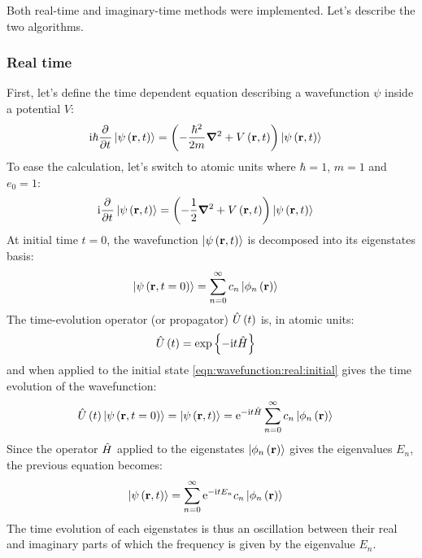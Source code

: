 Both real-time and imaginary-time methods were implemented. Let's describe the
two algorithms.


\subsubsection{Real time}

First, let's define the time dependent \schrodinger equation describing a
wavefunction $\psi$ inside a potential $V$:
\begin{align}
\textrm{i} \hbar \frac{\partial^{{}}   }{\partial t^{{}}} \left| \psi\left( \textbf{r}, t \right) \right>
    & = \left( -\frac{\hbar^2}{2 m} \bm{\nabla}^2 + V\left( \textbf{r}, t \right)  \right) \left| \psi\left( \textbf{r},
t \right) \right>
\label{eqn:schrodinger:si}
\end{align}
To ease the calculation, let's switch to atomic units where $\hbar = 1$, $m
= 1$ and $e_0 = 1$:
\begin{align}
\textrm{i} \frac{\partial^{{}}   }{\partial t^{{}}} \left| \psi\left( \textbf{r}, t \right) \right>
    & = \left( -\frac{1}{2} \bm{\nabla}^2 + V\left( \textbf{r}, t \right)  \right) \left| \psi\left( \textbf{r}, t \right) \right>
\label{eqn:schrodinger:au}
\end{align}
At initial time $t = 0$, the wavefunction $\left| \psi\left( \textbf{r}, t \right) \right>$ is
decomposed into its eigenstates basis:
\begin{align}
\left| \psi\left( \textbf{r}, t=0 \right) \right> & = \sum_{n=0}^{\infty} c_n \left| \phi_n\left( \textbf{r} \right) \right>
\label{eqn:wavefunction:real:initial}
\end{align}
The time-evolution operator (or propagator) $\hat{U}\left( t \right)$ is, in atomic units:
\begin{align}
\hat{U}\left( t \right) & = \exp{ \left\{  - \textrm{i}t  \hat{H} \right\}}
\label{eqn:propagator:real}
\end{align}
and when applied to the initial state \eqref{eqn:wavefunction:real:initial}
gives the time evolution of the wavefunction:
\begin{align}
\hat{U}\left( t \right) \left| \psi\left( \textbf{r}, t=0 \right) \right>
    = \left| \psi\left( \textbf{r}, t \right) \right>
  & = \textrm{e}^{ - \textrm{i} t \hat{H} } \sum_{n=0}^{\infty} c_n \left| \phi_n\left( \textbf{r} \right) \right>
\end{align}
Since the operator $\hat{H}$ applied to the eigenstates
$\left| \phi_n\left( \textbf{r} \right) \right>$ gives the eigenvalues $E_n$, the previous equation
becomes:
\begin{align}
\left| \psi\left( \textbf{r}, t \right) \right>
 & = \sum_{n=0}^{\infty} \textrm{e}^{ - \textrm{i} t E_n } c_n \left| \phi_n\left( \textbf{r} \right) \right>
\label{eqn:wavefunction:eigenstates:time_evolution:real}
\end{align}
The time evolution of each eigenstates is thus an oscillation between their real
and imaginary parts of which the frequency is given by the eigenvalue $E_n$.




